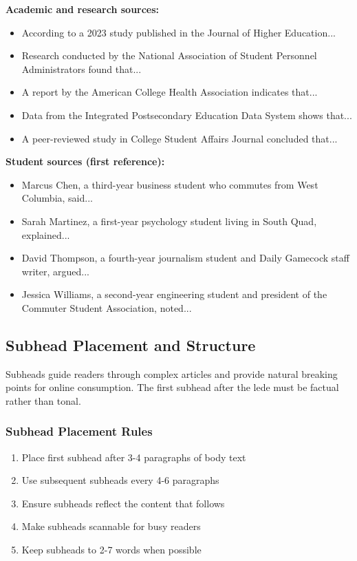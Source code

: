 \documentclass[12pt]{article}
\begin{document}
\begin{examplebox}
\textbf{Academic and research sources:}
\begin{itemize}
    \item According to a 2023 study published in the Journal of Higher Education...
    \item Research conducted by the National Association of Student Personnel Administrators found that...
    \item A report by the American College Health Association indicates that...
    \item Data from the Integrated Postsecondary Education Data System shows that...
    \item A peer-reviewed study in College Student Affairs Journal concluded that...
\end{itemize}
\end{examplebox}

\begin{examplebox}
\textbf{Student sources (first reference):}
\begin{itemize}
    \item Marcus Chen, a third-year business student who commutes from West Columbia, said...
    \item Sarah Martinez, a first-year psychology student living in South Quad, explained...
    \item David Thompson, a fourth-year journalism student and Daily Gamecock staff writer, argued...
    \item Jessica Williams, a second-year engineering student and president of the Commuter Student Association, noted...
\end{itemize}
\end{examplebox}

\newpage
\subsection{Subhead Placement and Structure}
\label{sec:subhead-placement}

Subheads guide readers through complex articles and provide natural breaking points for online consumption. The first subhead after the lede must be factual rather than tonal.

\subsubsection{Subhead Placement Rules}

\begin{enumerate}
    \item Place first subhead after 3-4 paragraphs of body text
    \item Use subsequent subheads every 4-6 paragraphs
    \item Ensure subheads reflect the content that follows
    \item Make subheads scannable for busy readers
    \item Keep subheads to 2-7 words when possible
\end{enumerate}
\end{document}
